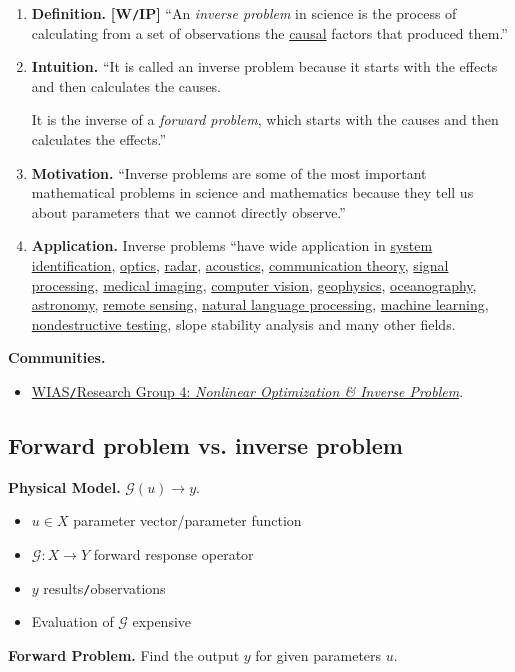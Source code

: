 \documentclass[oneside,11pt]{book}
\numberwithin{equation}{section}
\begin{document}
\begin{enumerate}
    \item \textbf{Definition.} \textbf{[W\texttt{/}IP]} ``An \textit{inverse problem} in science is the process of calculating from a set of observations the \href{https://en.wikipedia.org/wiki/Causal}{causal} factors that produced them.''
    \item \textbf{Intuition.} ``It is called an inverse problem because it starts with the effects and then calculates the causes.
    
    It is the inverse of a \textit{forward problem}, which starts with the causes and then calculates the effects.''
    \item \textbf{Motivation.} ``Inverse problems are some of the most important mathematical problems in science and mathematics because they tell us about parameters that we cannot directly observe.''
    \item \textbf{Application.} Inverse problems ``have wide application in \href{https://en.wikipedia.org/wiki/System_identification}{system identification}, \href{https://en.wikipedia.org/wiki/Optics}{optics}, \href{https://en.wikipedia.org/wiki/Radar}{radar}, \href{https://en.wikipedia.org/wiki/Acoustics}{acoustics}, \href{https://en.wikipedia.org/wiki/Communication_theory}{communication theory}, \href{https://en.wikipedia.org/wiki/Signal_processing}{signal processing}, \href{https://en.wikipedia.org/wiki/Medical_imaging}{medical imaging}, \href{https://en.wikipedia.org/wiki/Computer_vision}{computer vision}, \href{https://en.wikipedia.org/wiki/Geophysics}{geophysics}, \href{https://en.wikipedia.org/wiki/Oceanography}{oceanography}, \href{https://en.wikipedia.org/wiki/Astronomy}{astronomy}, \href{https://en.wikipedia.org/wiki/Remote_sensing}{remote sensing}, \href{https://en.wikipedia.org/wiki/Natural_language_processing}{natural language processing}, \href{https://en.wikipedia.org/wiki/Machine_learning}{machine learning}, \href{https://en.wikipedia.org/wiki/Nondestructive_testing}{nondestructive testing}, slope stability analysis and many other fields.
\end{enumerate}
\textbf{Communities.}
\begin{itemize}
    \item \href{https://www.wias-berlin.de/research/rgs/fg4/index.jsp}{WIAS\texttt{/}Research Group 4: \textit{Nonlinear Optimization \& Inverse Problem}}.
\end{itemize}

\subsection{Forward problem vs. inverse problem}
\textbf{Physical Model.} $\mathcal{G}(u)\to y$.
\begin{itemize}
    \item $u\in X$ parameter vector/parameter function
    \item $\mathcal{G}:X\to Y$ forward response operator
    \item $y$ results\texttt{/}observations
    \item Evaluation of $\mathcal{G}$ expensive
\end{itemize}
\textbf{Forward Problem.} Find the output $y$ for given parameters $u$.
\end{document}

